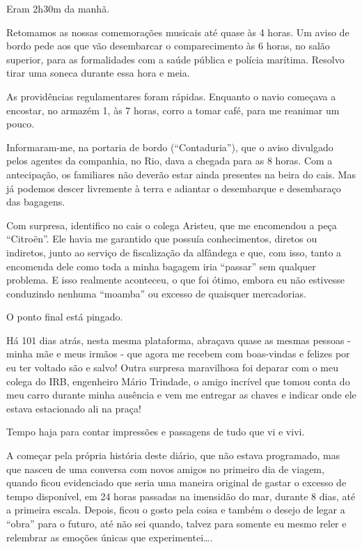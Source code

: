 Eram 2h30m da manhã.

Retomamos as nossas comemorações musicais até quase às 4 horas. Um aviso de bordo pede aos que vão desembarcar o comparecimento às 6 horas, no salão superior, para as formalidades com a saúde pública e polícia marítima. Resolvo tirar uma soneca durante essa hora e meia.

As providências regulamentares foram rápidas. Enquanto o navio começava a encostar, no armazém 1, às 7 horas, corro a tomar café, para me reanimar um pouco.

Informaram-me, na portaria de bordo (``Contaduria''), que o aviso divulgado pelos agentes da companhia, no Rio, dava a chegada para as 8 horas. Com a antecipação, os familiares não deverão estar ainda presentes na beira do cais. Mas já podemos descer livremente à terra e adiantar o desembarque e desembaraço das bagagens.

Com surpresa, identifico no cais o colega Aristeu, que me encomendou a peça ``Citroën''. Ele havia me garantido que possuía conhecimentos, diretos ou indiretos, junto ao serviço de fiscalização da alfândega e que, com isso, tanto a encomenda dele como toda a minha bagagem iria ``passar'' sem qualquer problema. E isso realmente aconteceu, o que foi ótimo, embora eu não estivesse conduzindo nenhuma ``moamba'' ou excesso de quaisquer mercadorias.

O ponto final está pingado.

Há 101 dias atrás, nesta mesma plataforma, abraçava quase as mesmas pessoas - minha mãe e meus irmãos - que agora me recebem com boas-vindas e felizes por eu ter voltado são e salvo! Outra surpresa maravilhosa foi deparar com o meu colega do IRB, engenheiro Mário Trindade, o amigo incrível que tomou conta do meu carro durante minha ausência e vem me entregar as chaves e indicar onde ele estava estacionado ali na praça!

Tempo haja para contar impressões e passagens de tudo que vi e vivi.

A começar pela própria história deste diário, que não estava programado, mas que nasceu de uma conversa com novos amigos no primeiro dia de viagem, quando ficou evidenciado que seria uma maneira original de gastar o excesso de tempo disponível, em 24 horas passadas na imensidão do mar, durante 8 dias, até a primeira escala. Depois, ficou o gosto pela coisa e também o desejo de legar a ``obra'' para o futuro, até não sei quando, talvez para somente eu mesmo reler e relembrar as emoções únicas que experimentei\ldots.

